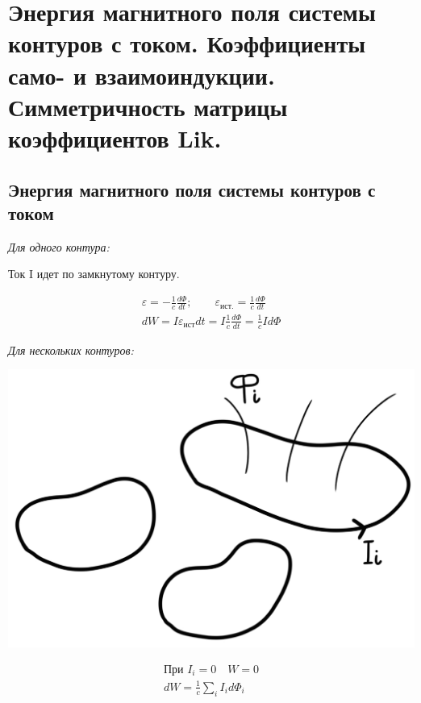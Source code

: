 \section{Энергия магнитного поля системы контуров с током. Коэффициенты само-
и взаимоиндукции. Симметричность матрицы коэффициентов Lik.}

\subsection*{Энергия магнитного поля системы контуров с током}

\textit{Для одного контура:}

Ток I идет по замкнутому контуру.

\begin{gather*}
    \varepsilon=-\frac{1}{c}\frac{d\Phi}{dt}; \qquad \varepsilon_{\text{ист.}}=\frac{1}{c}\frac{d\Phi}{dt} \\
    dW=I\varepsilon_{\text{ист}}dt=I \frac{1}{c}\frac{d\Phi}{dt}=\frac{1}{c}Id\Phi     
\end{gather*}

\textit{Для нескольких контуров:}

\begin{minipage}[c]{0.4\textwidth} %
    \includegraphics[width=\textwidth]{im/93.png}%
\end{minipage}%
\hfill
\begin{minipage}[c]{0.6\textwidth} %
    \begin{gather*}
        \text{При } I_i=0 \quad W=0 \\
        dW=\frac{1}{c}\sum_{i}I_id\Phi_i 
    \end{gather*}
\end{minipage}

